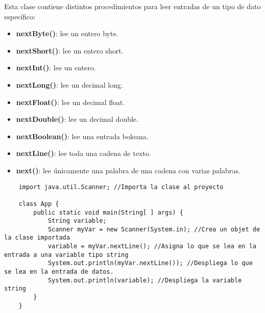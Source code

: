 Esta clase contiene distintos procedimientos para leer entradas de un tipo de dato específico:
\begin{itemize}
    \item \textbf{nextByte()}: lee un entero byte.
    \item \textbf{nextShort()}: lee un entero short.
    \item \textbf{nextInt()}: lee un entero.
    \item \textbf{nextLong()}: lee un decimal long.
    \item \textbf{nextFloat()}: lee un decimal float.
    \item \textbf{nextDouble()}: lee un decimal double.
    \item \textbf{nextBoolean()}: lee una entrada boleana.
    \item \textbf{nextLine()}: lee toda una cadena de texto.
    \item \textbf{next()}: lee únicamente una palabra de una cadena con varias palabras.
\end{itemize}
\begin{lstlisting}
    import java.util.Scanner; //Importa la clase al proyecto

    class App {
        public static void main(String[ ] args) {
            String variable;
            Scanner myVar = new Scanner(System.in); //Crea un objet de la clase importada
            variable = myVar.nextLine(); //Asigna lo que se lea en la entrada a una variable tipo string
            System.out.println(myVar.nextLine()); //Despliega lo que se lea en la entrada de datos.
            System.out.println(variable); //Despliega la variable string
        }
    }
\end{lstlisting}